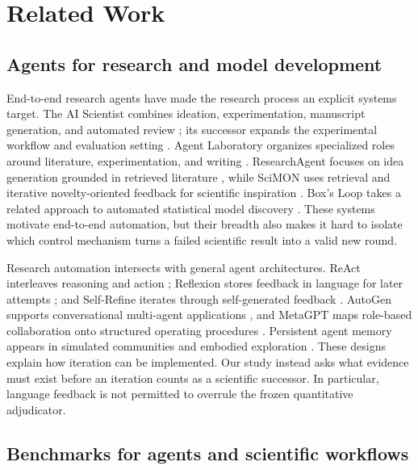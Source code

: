 \section{Related Work}

\subsection{Agents for research and model development}

End-to-end research agents have made the research process an explicit systems
target. The AI Scientist combines ideation, experimentation, manuscript
generation, and automated review \cite{lu2024aiscientist}; its successor
expands the experimental workflow and evaluation setting
\cite{yamada2025aiscientistv2}. Agent Laboratory organizes specialized roles
around literature, experimentation, and writing
\cite{schmidgall2025agentlab}. ResearchAgent focuses on idea generation
grounded in retrieved literature \cite{baek2025researchagent}, while SciMON
uses retrieval and iterative novelty-oriented feedback for scientific
inspiration \cite{wang2024scimon}. Box's Loop takes a related approach to
automated statistical model discovery \cite{li2024boxlm}. These systems
motivate end-to-end automation, but their breadth also makes it hard to
isolate which control mechanism turns a failed scientific result into a valid
new round.

Research automation intersects with general agent architectures. ReAct
interleaves reasoning and action \cite{yao2023react}; Reflexion stores
feedback in language for later attempts \cite{shinn2023reflexion}; and
Self-Refine iterates through self-generated feedback
\cite{madaan2023selfrefine}. AutoGen supports conversational multi-agent
applications \cite{wu2023autogen}, and MetaGPT maps role-based collaboration
onto structured operating procedures \cite{hong2024metagpt}. Persistent
agent memory appears in simulated communities
\cite{park2023generativeagents} and embodied exploration
\cite{wang2023voyager}. These designs explain how iteration can be
implemented. Our study instead asks what evidence must exist before an
iteration counts as a scientific successor. In particular, language feedback
is not permitted to overrule the frozen quantitative adjudicator.

\subsection{Benchmarks for agents and scientific workflows}

